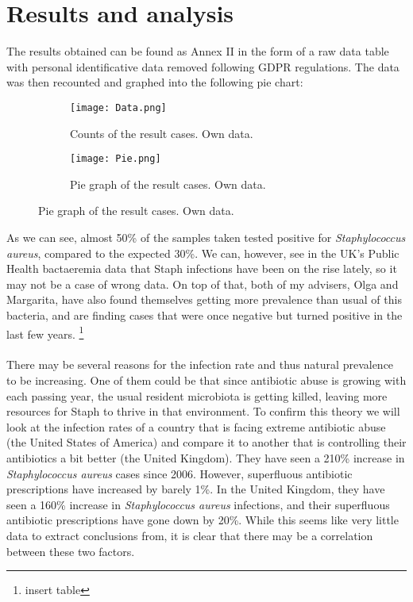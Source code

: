 \section{Results and analysis}
The results obtained can be found as Annex II in the form of a raw data table with personal identificative data removed following GDPR regulations. The data was then recounted and graphed into the following pie chart:
\begin{center}\begin{figure}[h!]  \centering\begin{subfigure}[b]{0.4\linewidth}\texttt{[image: Data.png]}\caption{Counts of the result cases. Own data.}\end{subfigure}\begin{subfigure}[b]{0.4\linewidth}\texttt{[image: Pie.png]}\caption{Pie graph of the result cases. Own data.}\end{subfigure}\end{figure}\end{center}
As we can see, almost 50\% of the samples taken tested positive for \emph{Staphylococcus aureus}, compared to the expected 30\%\cite{StaphylococcusAureusHealthcare2020}. We can, however, see in the UK's Public Health bactaeremia data that Staph infections have been on the rise lately, so it may not be a case of wrong data\cite{englandMSSABacteraemiaAnnual2021}. On top of that, both of my advisers, Olga and Margarita, have also found themselves getting more prevalence than usual of this bacteria, and are finding cases that were once negative but turned positive in the last few years. \footnote{insert table}
\paragraph{}There may be several reasons for the infection rate and thus natural prevalence to be increasing. One of them could be that since antibiotic abuse is growing with each passing year, the usual resident microbiota is getting killed, leaving more resources for Staph to thrive in that environment. To confirm this theory we will look at the infection rates of a country that is facing extreme antibiotic abuse (the United States of America) and compare it to another that is controlling their antibiotics a bit better (the United Kingdom). They have seen a 210\% increase in \emph{Staphylococcus aureus} cases since 2006. However, superfluous antibiotic prescriptions have increased by barely 1\%\cite{baggsEstimatingNationalTrends2016}. In the United Kingdom, they have seen a 160\% increase in \emph{Staphylococcus aureus} infections\cite{englandMSSABacteraemiaAnnual2021}, and their superfluous antibiotic prescriptions have gone down by 20\%. While this seems like very little data to extract conclusions from, it is clear that there may be a correlation between these two factors.
